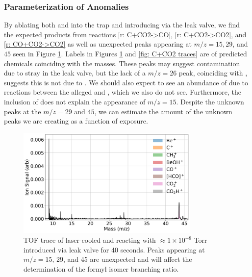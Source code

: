 
\subsubsection{Parameterization of Anomalies}

By ablating both  and  into the trap and introducing  via the leak valve, we find the expected products from reactions \ref{r: C+CO2->CO}, \ref{r: C+CO2->CO2}, and \ref{r: CO+CO2->CO2} as well as unexpected peaks appearing at $m/z=15, 29$, and $45$ seen in Figure \ref{fig: C+CO2 TOF}. Labels in Figures \ref{fig: C+CO2 TOF} and \ref{fig: C+CO2 traces} are of predicted chemicals coinciding with the masses. These peaks may suggest contamination due to stray  in the leak valve, but the lack of a $m/z=26$ peak, coinciding with , suggests this is not due to . We should also expect to see an abundance of  due to reactions between the alleged \ce{[HCO]+} and , which we also do not see. Furthermore, the inclusion of  does not explain the appearance of $m/z=15$. Despite the unknown peaks at the $m/z=29$ and $45$, we can estimate the amount of the unknown peaks we are creating as a function of  exposure.

\begin{figure}[H]
	\label{fig: C+CO2 TOF}
	\centering
	\includegraphics[width=0.8\textwidth]{images/C_CO2_TOF.png}
	\caption{TOF trace of laser-cooled  and  reacting with $\approx 1 \times 10^{-8}$ Torr  introduced via leak valve for 40 seconds. Peaks appearing at $m/z=15$, 29, and 45 are unexpected and will affect the determination of the formyl isomer branching ratio.}
\end{figure}

